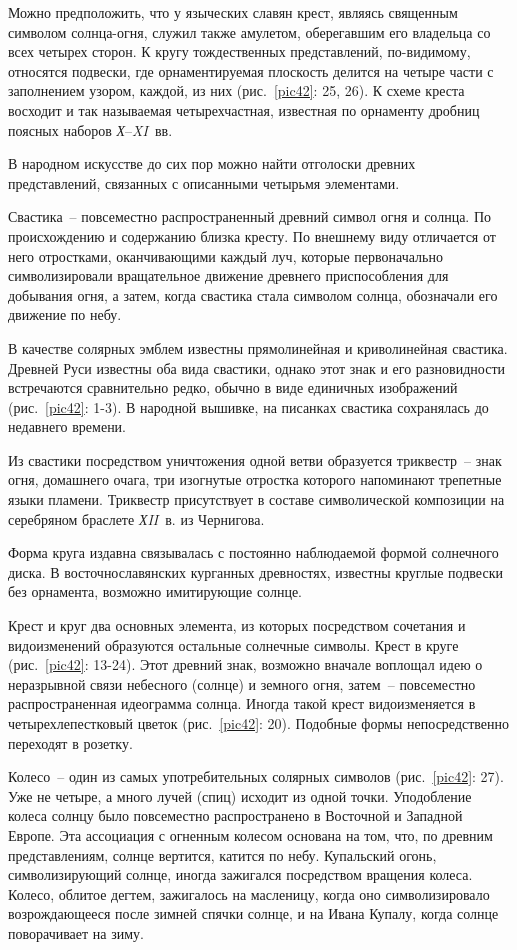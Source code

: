 \documentclass[pscyr,titlepage,chapters]{hedreport}
\begin{document}
  Можно предположить, что у языческих славян крест, являясь священным символом
  солнца-огня, служил также амулетом, оберегавшим его владельца со всех четырех
  сторон. К кругу тождественных представлений, по-видимому, относятся подвески,
  где орнаментируемая плоскость делится на четыре части с заполнением узором,
  каждой, из них (рис.~\ref{pic42}: 25, 26). К схеме креста восходит и так
  называемая четырехчастная, известная по орнаменту дробниц поясных наборов
  \emph{Х}--\emph{XI}~вв.

  В народном искусстве до сих пор можно найти отголоски древних представлений,
  связанных с описанными четырьмя элементами.

  Свастика~-- повсеместно распространенный древний символ огня и солнца. По
  происхождению и содержанию близка кресту. По внешнему виду отличается от него
  отростками, оканчивающими каждый луч, которые первоначально символизировали
  вращательное движение древнего приспособления для добывания огня, а затем,
  когда свастика стала символом солнца, обозначали его движение по небу.

  В качестве солярных эмблем известны прямолинейная и криволинейная свастика.
  Древней Руси известны оба вида свастики, однако этот знак и его разновидности
  встречаются сравнительно редко, обычно в виде единичных изображений
  (рис.~\ref{pic42}: 1-3). В народной вышивке, на писанках свастика сохранялась
  до недавнего времени.

  Из свастики посредством уничтожения одной ветви образуется триквестр~-- знак
  огня, домашнего очага, три изогнутые отростка которого напоминают трепетные
  языки пламени. Триквестр присутствует в составе символической композиции на
  серебряном браслете \emph{ХII}~в. из Чернигова.

  Форма круга издавна связывалась с постоянно наблюдаемой формой солнечного
  диска. В восточнославянских курганных древностях, известны круглые подвески
  без орнамента, возможно имитирующие солнце.

  Крест и круг два основных элемента, из которых посредством сочетания и
  видоизменений образуются остальные солнечные символы. Крест в круге
  (рис.~\ref{pic42}: 13-24). Этот древний знак, возможно вначале воплощал идею о
  неразрывной связи небесного (солнце) и земного огня, затем~-- повсеместно
  распространенная идеограмма солнца. Иногда такой крест видоизменяется в
  четырехлепестковый цветок (рис.~\ref{pic42}: 20). Подобные формы
  непосредственно переходят в розетку.

  Колесо~-- один из самых употребительных солярных символов (рис.~\ref{pic42}: 27).
  Уже не четыре, а много лучей (спиц) исходит из одной точки. Уподобление колеса
  солнцу было повсеместно распространено в Восточной и Западной Европе. Эта
  ассоциация с огненным колесом основана на том, что, по древним представлениям,
  солнце вертится, катится по небу.
  Купальский огонь, символизирующий солнце, иногда зажигался посредством
  вращения колеса. Колесо, облитое дегтем, зажигалось на масленицу, когда оно
  символизировало возрождающееся после зимней спячки солнце, и на Ивана Купалу,
  когда солнце поворачивает на зиму.
  
\end{document}
